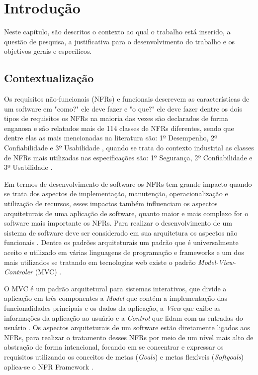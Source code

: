 \chapter{Introdução}

Neste capítulo, são descritos o contexto ao qual o trabalho está inserido, a questão de pesquisa, a justificativa para o desenvolvimento do trabalho e os objetivos gerais e específicos. 

\section{Contextualização}

Os requisitos não-funcionais (NFRs) e funcionais descrevem as características de um software em "como?" ele deve fazer e "o que?" ele deve fazer \cite{sommerville1997requirements}  dentre os dois tipos de requisitos os NFRs na maioria das vezes são declarados de forma enganosa \cite{eckhardt2016non} e são relatados mais de 114 classes de NFRs diferentes, sendo que dentre elas as mais mencionadas na literatura são: 1º Desempenho, 2º Confiabilidade e  3º Usabilidade \cite{mairiza2010investigation}, quando se trata do contexto industrial as classes de NFRs mais utilizadas nas especificações são: 1º Segurança, 2º Confiabilidade e 3º Usabilidade \cite{eckhardt2016non}.

Em termos de desenvolvimento de software os NFRs tem grande impacto quando se trata dos aspectos de implementação, manutenção, operacionalização e utilização de recursos, esses impactos também influenciam os aspectos arquiteturais de uma aplicação de software, quanto maior e mais complexo for o software mais importante os NFRs. Para realizar o desenvolvimento de um sistema de software deve ser considerado em sua arquitetura os aspectos não funcionais \cite{buschmann1996system}. Dentre os padrões arquiteturais um padrão que é universalmente aceito e utilizado em várias linguagens de programação e frameworks e um dos mais utilizados se tratando em tecnologias web existe o padrão \textit{Model-View-Controler} (MVC) \cite{jailia2016behavior}.

O MVC é um padrão arquitetural para sistemas interativos, que divide a aplicação em três componentes a \textit{Model} que contém a implementação das funcionalidades principais e os dados da aplicação, a \textit{View} que exibe as informações da aplicação ao usuário e a \textit{Control} que lidam com as entradas do usuário \cite{buschmann1996system}. Os aspectos arquiteturais de um software estão diretamente ligados aos NFRs, para realizar o tratamento desses NFRs por meio de um nível mais alto de abstração de forma intencional, focando em se concentrar e expressar os requisitos utilizando os conceitos de metas (\textit{Goals}) e metas flexíveis (\textit{Softgoals}) aplica-se o NFR Framework \cite{chung2009non}.

